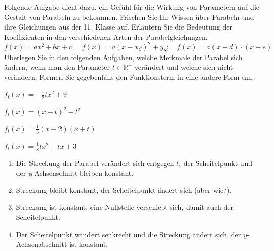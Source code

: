 \documentclass[11pt,a4paper,twoside,fleqn]{article}
\begin{document}
\begin{question}

  Folgende Aufgabe dient dazu, ein Gefühl für die Wirkung von
  Parametern auf die Gestalt von Parabeln zu bekommen. 
  Frischen Sie Ihr Wissen über Parabeln und ihre Gleichungen aus der
  11. Klasse auf. Erläutern Sie die Bedeutung der Koeffizienten in den
  verschiedenen Arten der Parabelgleichungen:
  $$f(x)=ax^2+bx+c;\quad f(x)=a(x-x_S)^2 + y_S;\quad
  f(x)=a(x-d)\cdot(x-e)$$
  Überlegen Sie in den folgenden Aufgaben, welche Merkmale der Parabel
  sich ändern, wenn man den Parameter $t\in\mathbb{R}^+$ verändert und
  welche sich  nicht verändern. Formen Sie gegebenfalls den
  Funktionsterm in eine andere Form um. 
  \begin{enumerate}\itemsep0pt
    \begin{multicols}{2}
    \item $f_t(x)=-\frac 1 2 tx^2+9$
    \item $f_t(x)=(x-t)^2-t^2$
    \item $f_t(x)=\frac 1 3 (x-2)(x+t)$
    \item $f_t(x)=\frac 1 8 t x^2+tx+3$
    \end{multicols}
\end{enumerate}
\end{question}
\begin{solution}
   \begin{enumerate}
      \item Die Streckung der Parabel verändert sich entgegen $t$, der
      Scheitelpunkt und der $y$-Achsenschnitt bleiben konstant.
    \item Streckung bleibt konstant, der Scheitelpunkt ändert sich
      (aber wie?).
    \item Streckung ist konstant, eine Nullstelle verschiebt sich,
      damit auch der Scheitelpunkt.
    \item Der Scheitelpunkt wandert senkrecht  und die Streckung
      ändert sich, der $y$-Achsenabschnitt ist konstant.
  \end{enumerate}
\end{solution}
\end{document}
